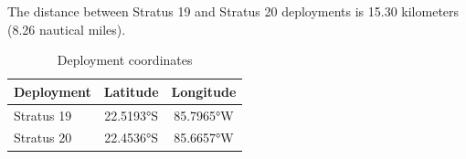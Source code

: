 
The distance between Stratus 19 and Stratus 20 deployments is 15.30 kilometers (8.26 nautical miles).

\begin{table}[ht]
\centering
\caption{Deployment coordinates}
\begin{tabular}{lcc}
\hline
\textbf{Deployment} & \textbf{Latitude} & \textbf{Longitude} \\
\hline
Stratus 19 & 22.5193°S & 85.7965°W \\
Stratus 20 & 22.4536°S & 85.6657°W \\
\hline
\end{tabular}
\end{table}
